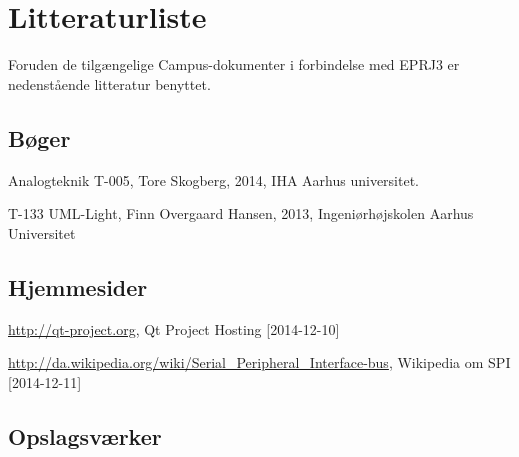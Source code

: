 \chapter{Litteraturliste}
Foruden de tilgængelige Campus-dokumenter i forbindelse med EPRJ3 er nedenstående litteratur benyttet. 

\section{Bøger}
Analogteknik T-005, Tore Skogberg, 2014, IHA Aarhus universitet.

T-133 UML-Light, Finn Overgaard Hansen, 2013, Ingeniørhøjskolen Aarhus Universitet

\section{Hjemmesider}

\url{http://qt-project.org}, Qt Project Hosting [2014-12-10]

\url{http://da.wikipedia.org/wiki/Serial_Peripheral_Interface-bus}, Wikipedia om SPI [2014-12-11]


\section{Opslagsværker}

